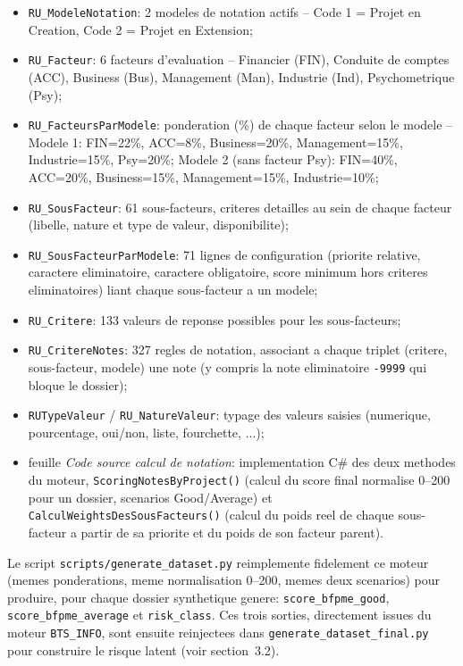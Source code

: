 \documentclass[11pt,a4paper]{article}
\begin{document}
\begin{itemize}[leftmargin=1.2cm]
  \item \texttt{RU\_ModeleNotation}: 2 modeles de notation actifs -- Code 1 = Projet en Creation, Code 2 = Projet en Extension;
  \item \texttt{RU\_Facteur}: 6 facteurs d'evaluation -- Financier (FIN), Conduite de comptes (ACC), Business (Bus), Management (Man), Industrie (Ind), Psychometrique (Psy);
  \item \texttt{RU\_FacteursParModele}: ponderation (\%) de chaque facteur selon le modele -- Modele 1: FIN=22\%, ACC=8\%, Business=20\%, Management=15\%, Industrie=15\%, Psy=20\%; Modele 2 (sans facteur Psy): FIN=40\%, ACC=20\%, Business=15\%, Management=15\%, Industrie=10\%;
  \item \texttt{RU\_SousFacteur}: 61 sous-facteurs, criteres detailles au sein de chaque facteur (libelle, nature et type de valeur, disponibilite);
  \item \texttt{RU\_SousFacteurParModele}: 71 lignes de configuration (priorite relative, caractere eliminatoire, caractere obligatoire, score minimum hors criteres eliminatoires) liant chaque sous-facteur a un modele;
  \item \texttt{RU\_Critere}: 133 valeurs de reponse possibles pour les sous-facteurs;
  \item \texttt{RU\_CritereNotes}: 327 regles de notation, associant a chaque triplet (critere, sous-facteur, modele) une note (y compris la note eliminatoire \texttt{-9999} qui bloque le dossier);
  \item \texttt{RUTypeValeur} / \texttt{RU\_NatureValeur}: typage des valeurs saisies (numerique, pourcentage, oui/non, liste, fourchette, ...);
  \item feuille \emph{Code source calcul de notation}: implementation C\# des deux methodes du moteur, \texttt{ScoringNotesByProject()} (calcul du score final normalise 0--200 pour un dossier, scenarios Good/Average) et \texttt{CalculWeightsDesSousFacteurs()} (calcul du poids reel de chaque sous-facteur a partir de sa priorite et du poids de son facteur parent).
\end{itemize}

Le script \texttt{scripts/generate\_dataset.py} reimplemente fidelement ce moteur (memes ponderations, meme normalisation 0--200, memes deux scenarios) pour produire, pour chaque dossier synthetique genere: \texttt{score\_bfpme\_good}, \texttt{score\_bfpme\_average} et \texttt{risk\_class}. Ces trois sorties, directement issues du moteur \texttt{BTS\_INFO}, sont ensuite reinjectees dans \texttt{generate\_dataset\_final.py} pour construire le risque latent (voir section~3.2).
\end{document}

